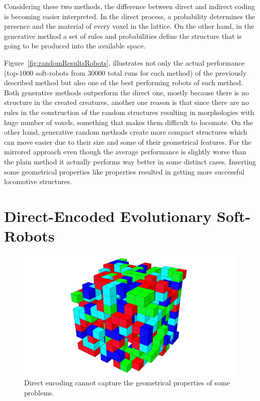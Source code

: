 Considering these two methods, the difference between direct and indirect coding is becoming easier interpreted. In the direct process, a probability determines the presence and the material of every voxel in the lattice. On the other hand, in the generative method a set of rules and probabilities define the structure that is going to be produced into the available space.

Figure~\ref{fig:randomResultsRobots}, illustrates not only the actual performance (top-$1000$ soft-robots from $30000$ total runs for each method) of the previously described method but also one of the best performing robots of each method. Both generative methods outperform the direct one, mostly because there is no structure in the created creatures, another one reason is that since there are no rules in the construction of the random structures resulting in morphologies with huge number of voxels, something that makes them difficult to locomote. On the other hand, generative random methods create more compact structures which can move easier due to their size and some of their geometrical features. For the mirrored approach even though the average performance is slightly worse than the plain method it actually performs way better in some distinct cases. Inserting some geometrical properties like properties resulted in getting more successful locomotive structures. 

\section{Direct-Encoded Evolutionary Soft-Robots}

\begin{figure}
\centering
\includegraphics[height=0.2\textheight]{../Figures/Robots/direct.jpg}
\caption{Direct encoding cannot capture the geometrical properties of some problems.}
\label{fig:directRobot}
\end{figure}

